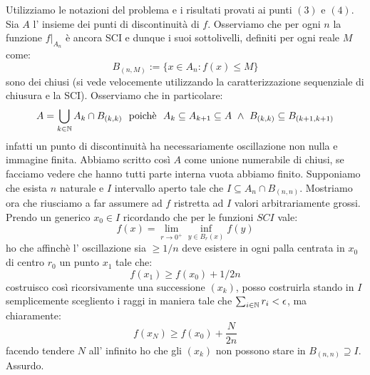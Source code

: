  Utilizziamo le notazioni del problema  e i risultati provati ai punti $(3)$ e $(4)$. Sia $A$ l' insieme dei punti di discontinuità di $f$. Osserviamo che per ogni $n$ la funzione $f\vert _{A_n}$ è ancora SCI e dunque i suoi sottolivelli, definiti per ogni reale $M$ come:
$$B_{(n,M)}:=\{x\in A_n: f(x)\leq M\}$$ 
sono dei chiusi (si vede velocemente utilizzando la caratterizzazione sequenziale di chiusura e la SCI). Osserviamo che in particolare: 
$$ A=\bigcup_{k\in \mathbb{N}} A_k\cap B_{(k,k)}\ \mbox{ poichè }\ A_k\subseteq A_{k+1}\subseteq A\ \wedge\ B_{(k,k)}\subseteq B_{(k+1,k+1)} $$
infatti un punto di discontinuità ha necessariamente oscillazione non nulla e immagine finita. Abbiamo scritto così $A$ come unione numerabile di chiusi, se facciamo vedere che hanno tutti parte interna vuota abbiamo finito. Supponiamo che esista $n$ naturale e $I$ intervallo aperto tale che $I\subseteq A_n\cap B_{(n,n)}$. Mostriamo ora che riusciamo a far assumere ad $f$ ristretta ad $I$ valori arbitrariamente grossi. Prendo un generico $x_0\in I$ ricordando che per le funzioni $SCI$ vale:
$$ f(x)=\lim_{r\rightarrow 0^+} \inf_{y\in B_{r}(x)} f(y) $$ 
ho che affinchè l' oscillazione sia $\geq 1/n$ deve esistere in ogni palla centrata in $x_0$ di centro $r_0$ un punto $x_1$ tale che:
$$ f(x_1)\geq f(x_0)+1/2n $$
costruisco così ricorsivamente una successione $(x_k)$, posso costruirla stando in $I$ semplicemente scegliento i raggi in maniera tale che $\sum_{i\in \mathbb{N}} r_i<\epsilon$, ma chiaramente:
$$ f(x_N)\geq f(x_0)+\frac{N}{2n} $$
facendo tendere $N$ all' infinito ho che gli $(x_k)$ non possono stare in $B_{(n,n)}\supseteq I$. Assurdo.

